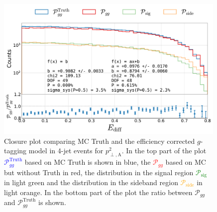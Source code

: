 \begin{figure}
  \centerfloat
  \includegraphics[width=0.99\textwidth, trim=10 0 20 5, clip, page=8]{figures/quarks/gtag-closure_test-down_sample=1.00-ML_vars=vertex-selection=b-ejet_min=4-n_iter_RS_lgb=99-n_iter_RS_xgb=9-cdot_cut=0.90-version=19-njet=4.pdf}
  \caption[Closure Plot Comparing MC Truth and the Efficiency Corrected $g$-Tagging Model in 4-Jet Events for $p^2_{\perp,\mathrm{A}}$]
          {Closure plot comparing MC Truth and the efficiency corrected $g$-tagging model in 4-jet events for $p^2_{\perp,\mathrm{A}}$. In the top part of the plot \textcolor{blue}{$\mathcal{P}_{gg}^\mathrm{Truth}$} based on MC Truth is shown in blue, the \textcolor{red}{$\mathcal{P}_{gg}$} based on MC but without Truth in red, the distribution in the signal region \textcolor{green}{$\mathcal{P}_{\mathrm{sig}}$} in light green and the distribution in the sideband region \textcolor{orange}{$\mathcal{P}_{\mathrm{side}}$} in light orange. In the bottom part of the plot the ratio between $\mathcal{P}_{gg}$ and $\mathcal{P}_{gg}^\mathrm{Truth}$  is shown. } 
  \label{fig:q:closure_variable_pt_antenna}
\end{figure}








\FloatBarrier
\newpage

